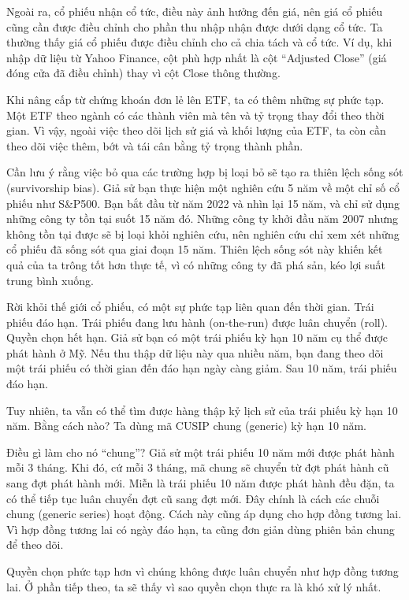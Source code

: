 Ngoài ra, cổ phiếu nhận cổ tức, điều này ảnh hưởng đến giá, nên giá cổ phiếu cũng cần được điều chỉnh cho phần thu nhập nhận được dưới dạng cổ tức. Ta thường thấy giá cổ phiếu được điều chỉnh cho cả chia tách và cổ tức. Ví dụ, khi nhập dữ liệu từ Yahoo Finance, cột phù hợp nhất là cột ``Adjusted Close'' (giá đóng cửa đã điều chỉnh) thay vì cột Close thông thường.

Khi nâng cấp từ chứng khoán đơn lẻ lên ETF, ta có thêm những sự phức tạp. Một ETF theo ngành có các thành viên mà tên và tỷ trọng thay đổi theo thời gian. Vì vậy, ngoài việc theo dõi lịch sử giá và khối lượng của ETF, ta còn cần theo dõi việc thêm, bớt và tái cân bằng tỷ trọng thành phần.

Cần lưu ý rằng việc bỏ qua các trường hợp bị loại bỏ sẽ tạo ra thiên lệch sống sót (survivorship bias). Giả sử bạn thực hiện một nghiên cứu 5 năm về một chỉ số cổ phiếu như S\&P500. Bạn bắt đầu từ năm 2022 và nhìn lại 15 năm, và chỉ sử dụng những công ty tồn tại suốt 15 năm đó. Những công ty khởi đầu năm 2007 nhưng không tồn tại được sẽ bị loại khỏi nghiên cứu, nên nghiên cứu chỉ xem xét những cổ phiếu đã sống sót qua giai đoạn 15 năm. Thiên lệch sống sót này khiến kết quả của ta trông tốt hơn thực tế, vì có những công ty đã phá sản, kéo lợi suất trung bình xuống.

Rời khỏi thế giới cổ phiếu, có một sự phức tạp liên quan đến thời gian. Trái phiếu đáo hạn. Trái phiếu đang lưu hành (on-the-run) được luân chuyển (roll). Quyền chọn hết hạn. Giả sử bạn có một trái phiếu kỳ hạn 10 năm cụ thể được phát hành ở Mỹ. Nếu thu thập dữ liệu này qua nhiều năm, bạn đang theo dõi một trái phiếu có thời gian đến đáo hạn ngày càng giảm. Sau 10 năm, trái phiếu đáo hạn.

Tuy nhiên, ta vẫn có thể tìm được hàng thập kỷ lịch sử của trái phiếu kỳ hạn 10 năm. Bằng cách nào? Ta dùng mã CUSIP chung (generic) kỳ hạn 10 năm.

Điều gì làm cho nó ``chung''? Giả sử một trái phiếu 10 năm mới được phát hành mỗi 3 tháng. Khi đó, cứ mỗi 3 tháng, mã chung sẽ chuyển từ đợt phát hành cũ sang đợt phát hành mới. Miễn là trái phiếu 10 năm được phát hành đều đặn, ta có thể tiếp tục luân chuyển đợt cũ sang đợt mới. Đây chính là cách các chuỗi chung (generic series) hoạt động. Cách này cũng áp dụng cho hợp đồng tương lai. Vì hợp đồng tương lai có ngày đáo hạn, ta cũng đơn giản dùng phiên bản chung để theo dõi.

Quyền chọn phức tạp hơn vì chúng không được luân chuyển như hợp đồng tương lai. Ở phần tiếp theo, ta sẽ thấy vì sao quyền chọn thực ra là khó xử lý nhất.

